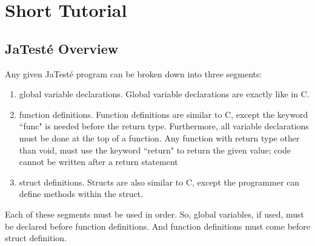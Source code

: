\documentclass{article}
\begin{document}
\newpage

\section{Short Tutorial}
\subsection{JaTest\'{e} Overview}
Any given JaTest\'{e} program can be broken down into three segments: 
\begin{enumerate}
\item global variable declarations. Global variable declarations are exactly like in C. 
\item function definitions. Function definitions are similar to C, except the keyword ``func" is needed before the return type. Furthermore, all variable declarations must be done at the top of a function. Any function with return type other than void, must use the keyword ``return" to return the given value; code cannot be written after a return statement
\item struct definitions. Structs are also similar to C, except the programmer can define methods within the struct.
\end{enumerate}
Each of these segments must be used in order. So, global variables, if used, must be declared before function definitions. And function definitions must come before struct definition.
\end{document}
